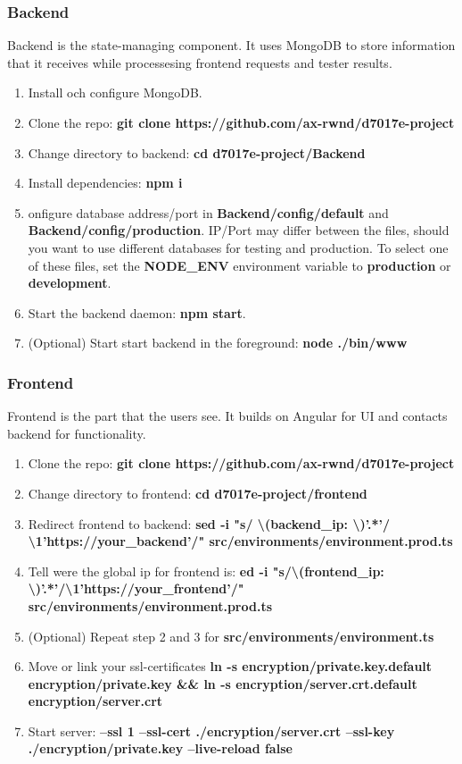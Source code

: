 \subsubsection{Backend}
Backend is the state-managing component. It uses MongoDB to store information that it receives while processesing frontend requests and tester results.
\begin{enumerate}
\item Install och configure MongoDB.
\item Clone the repo: \textbf{git clone https://github.com/ax-rwnd/d7017e-project}
\item Change directory to backend: \textbf{cd d7017e-project/Backend}
\item Install dependencies: \textbf{npm i}
\item onfigure database address/port in \textbf{Backend/config/default} and \textbf{Backend/config/production}. IP/Port may differ between the files, should you want to use different databases for testing and production. To select one of these files, set the \textbf{NODE\_ENV} environment variable to \textbf{production} or \textbf{development}.
\item Start the backend daemon: \textbf{npm start}.
\item (Optional) Start start backend in the foreground: \textbf{node ./bin/www}
\end{enumerate}

\subsubsection{Frontend}
Frontend is the part that the users see. It builds on Angular for UI and contacts backend for functionality.

\begin{enumerate}
    \item Clone the repo: \textbf{git clone https://github.com/ax-rwnd/d7017e-project}
    \item Change directory to frontend: \textbf{cd d7017e-project/frontend}
    \item Redirect frontend to backend: \textbf{sed -i "s/ \textbackslash (backend\_ip: \textbackslash )'.*'/ \\ \textbackslash 1'https://{your\_backend}'/" src/environments/environment.prod.ts}
    \item Tell were the global ip for frontend is: \textbf{ed -i "s/\textbackslash (frontend\_ip: \\ \textbackslash)'.*'/\textbackslash 1'https://{your\_frontend}'/" src/environments/environment.prod.ts}
    \item (Optional) Repeat step 2 and 3 for \textbf{src/environments/environment.ts}
    \item Move or link your ssl-certificates \textbf{ln -s encryption/private.key.default encryption/private.key \&\& ln -s encryption/server.crt.default encryption/server.crt}
    \item Start server: \textbf{--ssl 1 --ssl-cert ./encryption/server.crt --ssl-key ./encryption/private.key --live-reload false}
\end{enumerate}

